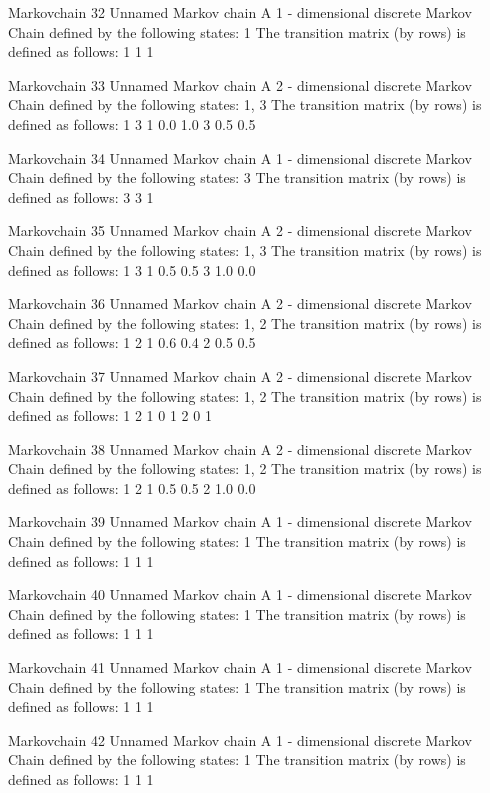 \documentclass[
  nojss]{jss}
\begin{document}
\begin{CodeChunk}
\begin{CodeOutput}
Markovchain  32 
Unnamed Markov chain 
 A  1 - dimensional discrete Markov Chain defined by the following states: 
 1 
 The transition matrix  (by rows)  is defined as follows: 
  1
1 1

Markovchain  33 
Unnamed Markov chain 
 A  2 - dimensional discrete Markov Chain defined by the following states: 
 1, 3 
 The transition matrix  (by rows)  is defined as follows: 
    1   3
1 0.0 1.0
3 0.5 0.5

Markovchain  34 
Unnamed Markov chain 
 A  1 - dimensional discrete Markov Chain defined by the following states: 
 3 
 The transition matrix  (by rows)  is defined as follows: 
  3
3 1

Markovchain  35 
Unnamed Markov chain 
 A  2 - dimensional discrete Markov Chain defined by the following states: 
 1, 3 
 The transition matrix  (by rows)  is defined as follows: 
    1   3
1 0.5 0.5
3 1.0 0.0

Markovchain  36 
Unnamed Markov chain 
 A  2 - dimensional discrete Markov Chain defined by the following states: 
 1, 2 
 The transition matrix  (by rows)  is defined as follows: 
    1   2
1 0.6 0.4
2 0.5 0.5

Markovchain  37 
Unnamed Markov chain 
 A  2 - dimensional discrete Markov Chain defined by the following states: 
 1, 2 
 The transition matrix  (by rows)  is defined as follows: 
  1 2
1 0 1
2 0 1

Markovchain  38 
Unnamed Markov chain 
 A  2 - dimensional discrete Markov Chain defined by the following states: 
 1, 2 
 The transition matrix  (by rows)  is defined as follows: 
    1   2
1 0.5 0.5
2 1.0 0.0

Markovchain  39 
Unnamed Markov chain 
 A  1 - dimensional discrete Markov Chain defined by the following states: 
 1 
 The transition matrix  (by rows)  is defined as follows: 
  1
1 1

Markovchain  40 
Unnamed Markov chain 
 A  1 - dimensional discrete Markov Chain defined by the following states: 
 1 
 The transition matrix  (by rows)  is defined as follows: 
  1
1 1

Markovchain  41 
Unnamed Markov chain 
 A  1 - dimensional discrete Markov Chain defined by the following states: 
 1 
 The transition matrix  (by rows)  is defined as follows: 
  1
1 1

Markovchain  42 
Unnamed Markov chain 
 A  1 - dimensional discrete Markov Chain defined by the following states: 
 1 
 The transition matrix  (by rows)  is defined as follows: 
  1
1 1


\end{CodeOutput}
\end{CodeChunk}
\end{document}
